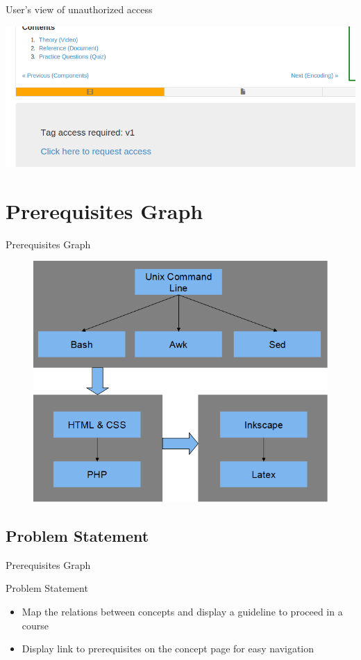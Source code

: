 \documentclass{beamer}
\begin{document}
\begin{frame}{User's view of unauthorized access}
	\begin{center}
		\includegraphics[width=1\linewidth]{media/sAccessNot}
	\end{center}
\end{frame}

\section{Prerequisites Graph}

\begin{frame}{Prerequisites Graph}
	\begin{figure}
		\centering
		\includegraphics[width=0.7\linewidth]{media/prereq-graph}
		\label{fig:prereq-graph-calc}
	\end{figure}
\end{frame}

\subsection{Problem Statement}

\begin{frame}{Prerequisites Graph}
	\begin{block}{Problem Statement}
		\begin{itemize}
			\item Map the relations between concepts and display a guideline to proceed in a course
			\item Display link to prerequisites on the concept page for easy navigation
		\end{itemize}
	\end{block}
\end{frame}
\end{document}
